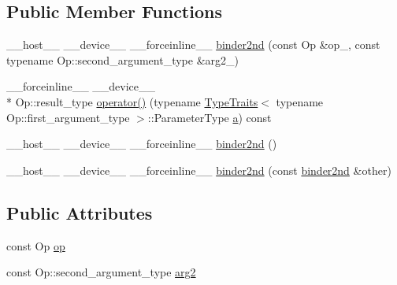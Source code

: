 \subsection*{Public Member Functions}
\begin{DoxyCompactItemize}
\item 
\-\_\-\-\_\-host\-\_\-\-\_\- \-\_\-\-\_\-device\-\_\-\-\_\- \-\_\-\-\_\-forceinline\-\_\-\-\_\- \hyperlink{structcv_1_1gpu_1_1device_1_1binder2nd_aab439fe877aa8a3a369b581377bff122}{binder2nd} (const Op \&op\-\_\-, const typename Op\-::second\-\_\-argument\-\_\-type \&arg2\-\_\-)
\item 
\-\_\-\-\_\-forceinline\-\_\-\-\_\- \-\_\-\-\_\-device\-\_\-\-\_\- \\*
Op\-::result\-\_\-type \hyperlink{structcv_1_1gpu_1_1device_1_1binder2nd_a14a996f68c7e97fab544f33e9928dd18}{operator()} (typename \hyperlink{structcv_1_1gpu_1_1device_1_1TypeTraits}{Type\-Traits}$<$ typename Op\-::first\-\_\-argument\-\_\-type $>$\-::Parameter\-Type \hyperlink{legacy_8hpp_a1031d0e0a97a340abfe0a6ab9e831045}{a}) const 
\item 
\-\_\-\-\_\-host\-\_\-\-\_\- \-\_\-\-\_\-device\-\_\-\-\_\- \-\_\-\-\_\-forceinline\-\_\-\-\_\- \hyperlink{structcv_1_1gpu_1_1device_1_1binder2nd_a7d24257387cb4b52104f6d8a0a926fea}{binder2nd} ()
\item 
\-\_\-\-\_\-host\-\_\-\-\_\- \-\_\-\-\_\-device\-\_\-\-\_\- \-\_\-\-\_\-forceinline\-\_\-\-\_\- \hyperlink{structcv_1_1gpu_1_1device_1_1binder2nd_ac04596ed04cc7a0294664765c462842a}{binder2nd} (const \hyperlink{structcv_1_1gpu_1_1device_1_1binder2nd}{binder2nd} \&other)
\end{DoxyCompactItemize}
\subsection*{Public Attributes}
\begin{DoxyCompactItemize}
\item 
const Op \hyperlink{structcv_1_1gpu_1_1device_1_1binder2nd_afeaabb51d77e0bb9f2828340aa62f26d}{op}
\item 
const Op\-::second\-\_\-argument\-\_\-type \hyperlink{structcv_1_1gpu_1_1device_1_1binder2nd_a61906ed07087367d669418e9614e9431}{arg2}
\end{DoxyCompactItemize}


